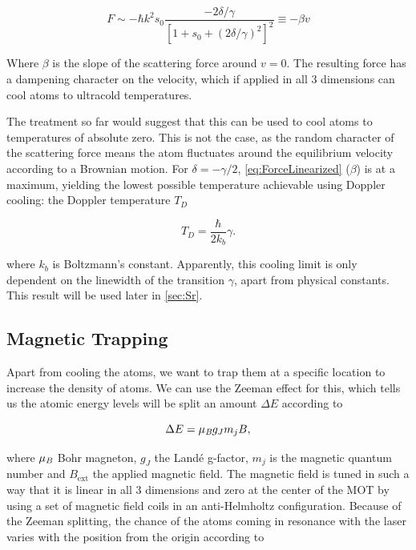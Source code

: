 \begin{equation}\label{eq:ForceLinearized}
	F \sim - \hbar k^2 s_0 \frac{-2\delta/\gamma}{\left[1+s_0+(2\delta/\gamma)^2\right]^2} \equiv -\beta v
\end{equation}

Where $\beta$ is the slope of the scattering force around $v=0$. The resulting force has a dampening character on the velocity, which if applied in all 3 dimensions can cool atoms to ultracold temperatures. 

The treatment so far would suggest that this can be used to cool atoms to temperatures of absolute zero. This is not the case, as the random character of the scattering force means the atom fluctuates around the equilibrium velocity according to a Brownian motion. For $\delta=-\gamma/2$, \cref{eq:ForceLinearized} ($\beta$) is at a maximum, yielding the lowest possible temperature achievable using Doppler cooling: the Doppler temperature $T_D$ \cite{Metcalf1999}

\begin{equation}\label{eq:DopplerTemperature}
	T_D = \frac{\hbar}{2k_b} \gamma.
\end{equation}

where $k_b$ is Boltzmann's constant. Apparently, this cooling limit is only dependent on the linewidth of the transition $\gamma$, apart from physical constants. This result will be used later in \cref{sec:Sr}.

\subsection{Magnetic Trapping}

Apart from cooling the atoms, we want to trap them at a specific location to increase the density of atoms. We can use the Zeeman effect for this, which tells us the atomic energy levels will be split an amount $\Delta E$ according to \cite{Griffiths2004}

\begin{equation}\label{eq:Zeeman}
	\Delta E = \mu_{\emph{B}} g_J m_j B,
\end{equation}

where $\mu_{\emph{B}}$ Bohr magneton, $g_J$ the Landé g-factor, $m_j$ is the magnetic quantum number and $B_{\text{ext}}$ the applied magnetic field. The magnetic field is tuned in such a way that it is linear in all 3 dimensions and zero at the center of the \ac{MOT} by using a set of magnetic field coils in an anti-Helmholtz configuration. Because of the Zeeman splitting, the chance of the atoms coming in resonance with the laser varies with the position from the origin according to \cite{Kowalski2010}

